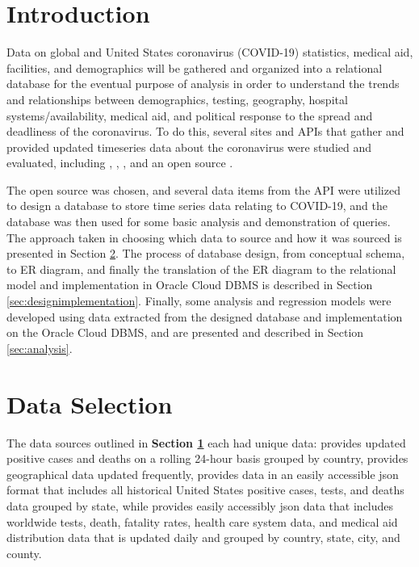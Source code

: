 \documentclass[11pt]{article}
\newcommand{\MYhref}[3][blue]{\href{#2}{\color{#1}{#3}}}%
\begin{document}
\pagebreak

\section{Introduction}
\label{sec:Intro}
\noindent
Data on global and United States coronavirus (COVID-19) statistics, medical aid, facilities, and demographics will be gathered and organized into a relational database for the eventual purpose of analysis in order to understand the trends and relationships between demographics, testing, geography, hospital systems/availability, medical aid, and political response to the spread and deadliness of the coronavirus. To do this, several sites and APIs that gather and provided updated timeseries data about the coronavirus were studied and evaluated, including \MYhref{https://www.worldometers.info/coronavirus/}{Worldometer}, \MYhref{https://coronavirus.jhu.edu/map.html}{John Hopkins Coronavirus Resource Center}, \MYhref{https://covidtracking.com/api}{The Covid Tracking Project}, and an open source \MYhref{https://www.npmjs.com/package/covid19-api}{Covid-19 API}. 

\noindent
The open source \MYhref{https://www.npmjs.com/package/covid19-api}{Covid-19 API} was chosen, and several data items from the API were utilized to design a database to store time series data relating to COVID-19, and the database was then used for some basic analysis and demonstration of queries. The approach taken in choosing which data to source and how it was sourced is presented in Section \ref{sec:approachsec}. The process of database design, from conceptual schema, to ER diagram, and finally the translation of the ER diagram to the relational model and implementation in Oracle Cloud DBMS is described in Section \ref{sec:designimplementation}. Finally, some analysis and regression models were developed using data extracted from the designed database and implementation on the Oracle Cloud DBMS, and are presented and described in Section \ref{sec:analysis}.

\section{Data Selection}
\label{sec:approachsec}

\noindent
The data sources outlined in \textbf{Section \ref{sec:Intro}} each had unique data: \MYhref{https://www.worldometers.info/coronavirus/}{Worldometer} provides updated positive cases and deaths on a rolling 24-hour basis grouped by country, \MYhref{https://coronavirus.jhu.edu/map.html}{John Hopkins Coronavirus Resource Center} provides geographical data updated frequently, \MYhref{https://covidtracking.com/api}{The Covid Tracking Project} provides data in an easily accessible json format that includes all historical United States positive cases, tests, and deaths data grouped by state, while \MYhref{https://www.npmjs.com/package/covid19-api}{Covid-19 API} provides easily accessibly json data that includes worldwide tests, death, fatality rates, health care system data, and medical aid distribution data that is updated daily and grouped by country, state, city, and county.
\end{document}
